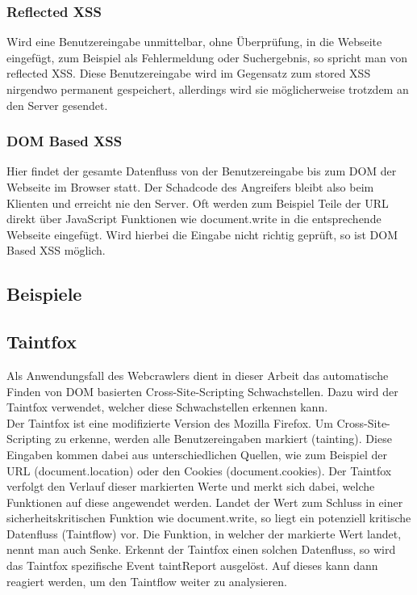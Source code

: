 \subsubsection{Reflected XSS}
Wird eine Benutzereingabe unmittelbar, ohne Überprüfung, in die Webseite eingefügt, zum Beispiel als Fehlermeldung oder Suchergebnis, so spricht man von reflected XSS. Diese Benutzereingabe wird im Gegensatz zum stored XSS nirgendwo permanent gespeichert, allerdings wird sie möglicherweise trotzdem an den Server gesendet.
\subsubsection{DOM Based XSS}
Hier findet der gesamte Datenfluss von der Benutzereingabe bis zum DOM der Webseite im Browser statt. Der Schadcode des Angreifers bleibt also beim Klienten und erreicht nie den Server. Oft werden zum Beispiel Teile der URL direkt über JavaScript Funktionen wie document.write in die entsprechende Webseite eingefügt. Wird hierbei die Eingabe nicht richtig geprüft, so ist DOM Based XSS möglich.
\subsection{Beispiele}

\subsection{Taintfox}
Als Anwendungsfall des Webcrawlers dient in dieser Arbeit das automatische Finden von DOM basierten Cross-Site-Scripting Schwachstellen. Dazu wird der Taintfox verwendet, welcher diese Schwachstellen erkennen kann. \\
Der Taintfox ist eine modifizierte Version des Mozilla Firefox. Um Cross-Site-Scripting zu erkenne, werden alle Benutzereingaben markiert (tainting). Diese Eingaben kommen dabei aus unterschiedlichen Quellen, wie zum Beispiel der URL (document.location) oder den Cookies (document.cookies). Der Taintfox verfolgt den Verlauf dieser markierten Werte und merkt sich dabei, welche Funktionen auf diese angewendet werden. Landet der Wert zum Schluss in einer sicherheitskritischen Funktion wie document.write, so liegt ein potenziell kritische Datenfluss (Taintflow) vor. Die Funktion, in welcher der markierte Wert landet, nennt man auch Senke. Erkennt der Taintfox einen solchen Datenfluss, so wird das Taintfox spezifische Event taintReport ausgelöst. Auf dieses kann dann reagiert werden, um den Taintflow weiter zu analysieren.


